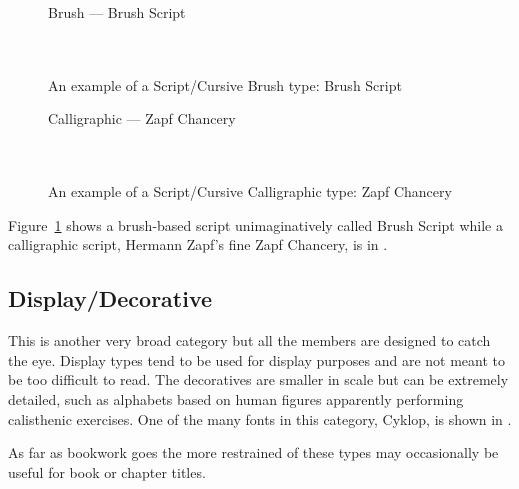 \documentclass[10pt,a4paper,extrafontsizes]{memoir}
\begin{document}
\begin{figure}
\centering
{\centering%
  Brush  --- Brush Script \\
  \UCalphabet \\
  \LCalphabet \\
  \fox\par}
\caption{An example of a Script/Cursive Brush type: Brush Script} 
   \label{fig:brush}
\end{figure}

\begin{figure}
\centering
{\centering{}\selectfont
  Calligraphic --- Zapf Chancery \\
  \UCalphabet \\
  \LCalphabet \\
  \fox\par}
\caption{An example of a Script/Cursive Calligraphic type: Zapf Chancery} 
   \label{fig:chancery}
\end{figure}

\begin{paracol}{2}
\switchEng
    Figure~\ref{fig:brush} shows a brush-based script 
unimaginatively called 
Brush Script while a
calligraphic script, Hermann Zapf's fine
Zapf Chancery,
is in .
\end{paracol}

\subsection{Display/Decorative}

\begin{paracol}{2}
\switchEng
    This is another very broad category 
but all the members are designed
to catch the eye. Display types tend to be used for display purposes and
are not meant to be too difficult to read. The decoratives are smaller in scale
but can be extremely detailed, such as alphabets based on human figures 
apparently performing calisthenic exercises. One of the many fonts
in this category, Cyklop, is shown in 
.

    As far as bookwork goes the more restrained of these types may occasionally
be useful for book or chapter titles.
\end{paracol}
\end{document}
